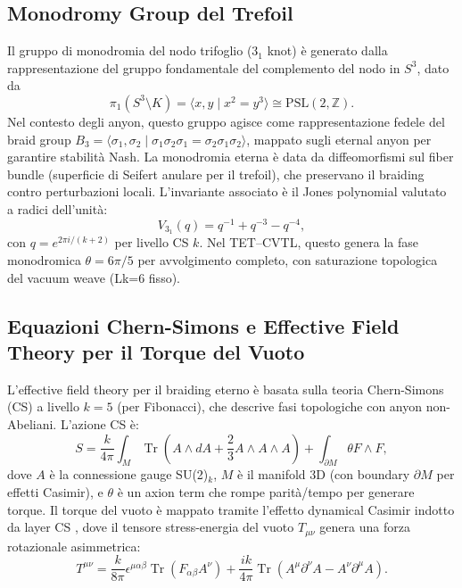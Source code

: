 \documentclass[11pt,a4paper]{article}
\let\oldcite\cite
\renewcommand{\cite}{\protect\oldcite}
\theoremstyle{plain}
\theoremstyle{definition}
\begin{document}
\subsection{Monodromy Group del Trefoil}

Il gruppo di monodromia del nodo trifoglio (3$_1$ knot) è generato dalla rappresentazione del gruppo fondamentale del complemento del nodo in $S^3$, dato da
\begin{equation}
\pi_1(S^3 \setminus K) = \langle x, y \mid x^2 = y^3 \rangle \cong \mathrm{PSL}(2,\mathbb{Z}).
\end{equation}
Nel contesto degli anyon, questo gruppo agisce come rappresentazione fedele del braid group $B_3 = \langle \sigma_1, \sigma_2 \mid \sigma_1 \sigma_2 \sigma_1 = \sigma_2 \sigma_1 \sigma_2 \rangle$, mappato sugli eternal anyon per garantire stabilità Nash. La monodromia eterna è data da diffeomorfismi sul fiber bundle (superficie di Seifert anulare per il trefoil), che preservano il braiding contro perturbazioni locali. L'invariante associato è il Jones polynomial valutato a radici dell'unità:
\begin{equation}
V_{3_1}(q) = q^{-1} + q^{-3} - q^{-4},
\end{equation}
con $q = e^{2\pi i / (k+2)}$ per livello CS $k$. Nel TET--CVTL, questo genera la fase monodromica $\theta = 6\pi/5$ per avvolgimento completo, con saturazione topologica del vacuum weave (Lk=6 fisso).


\vspace{0.4cm}

\subsection{Equazioni Chern-Simons e Effective Field Theory per il Torque del Vuoto}

L'effective field theory per il braiding eterno è basata sulla teoria Chern-Simons (CS) a livello $k=5$ (per Fibonacci), che descrive fasi topologiche con anyon non-Abeliani. L'azione CS è:
\begin{equation}
S = \frac{k}{4\pi} \int_M \operatorname{Tr} \left( A \wedge dA + \frac{2}{3} A \wedge A \wedge A \right) + \int_{\partial M} \theta F \wedge F,
\end{equation}
dove $A$ è la connessione gauge SU(2)$_k$, $M$ è il manifold 3D (con boundary $\partial M$ per effetti Casimir), e $\theta$ è un axion term che rompe parità/tempo per generare torque. Il torque del vuoto è mappato tramite l'effetto dynamical Casimir indotto da layer CS \cite{Marachevsky2024Casimir}, dove il tensore stress-energia del vuoto $T_{\mu\nu}$ genera una forza rotazionale asimmetrica:
\begin{equation}
T^{\mu\nu} = \frac{k}{8\pi} \epsilon^{\mu\alpha\beta} \operatorname{Tr} \left( F_{\alpha\beta} A^\nu \right) + \frac{i k}{4\pi} \operatorname{Tr} \left( A^\mu \partial^\nu A - A^\nu \partial^\mu A \right).
\end{equation}
\end{document}
